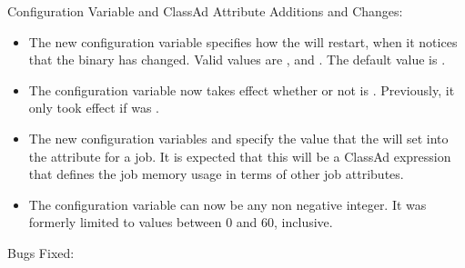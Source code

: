 \noindent Configuration Variable and ClassAd Attribute Additions and Changes:

\begin{itemize}

\item The new configuration variable  
specifies how the  will restart,
when it notices that the  binary has changed. 
Valid values are ,  and . 
The default value is .

\item The configuration variable  now takes effect
whether or not  is .  Previously,
it only took effect if  was .

\item The new configuration variables  and
 specify the value that the 
 will
set into the  attribute for a job.  It is expected that
this will be a ClassAd expression that defines the job memory usage in terms
of other job attributes.

\item The configuration variable  can now be any
non negative integer.  It was formerly limited to values between 0 and 60,
inclusive.

\end{itemize}

\noindent Bugs Fixed:

